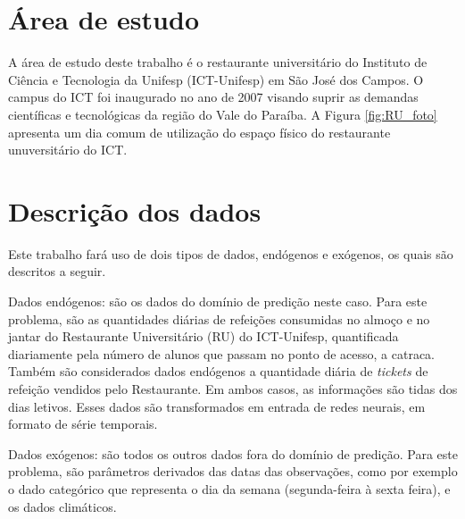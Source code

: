     \section{Área de estudo}
       A área de estudo deste trabalho é o restaurante universitário do Instituto de Ciência e Tecnologia da Unifesp (ICT-Unifesp) em São José dos Campos. O campus do ICT foi inaugurado no ano de 2007 visando suprir as demandas científicas e tecnológicas da região do Vale do Paraíba. A Figura \ref{fig:RU_foto} apresenta um dia comum de utilização do espaço físico do restaurante unuversitário do ICT.
        
        \begin{figure}[H]
        \end{figure}
    
    \section{Descrição dos dados}

    Este trabalho fará uso de dois tipos de dados, endógenos e exógenos, os quais são descritos a seguir. 
            
    Dados endógenos:  são os dados do domínio de predição neste caso. Para este problema, são as quantidades diárias de  refeições consumidas no almoço e no jantar do Restaurante Universitário (RU) do ICT-Unifesp, quantificada diariamente pela número de alunos que passam no ponto de acesso, a catraca. 
    Também são considerados dados endógenos a quantidade diária  de \textit{tickets} de refeição vendidos pelo Restaurante. Em ambos casos, as informações são tidas dos dias letivos.   Esses dados são transformados em entrada de redes neurais, em formato de série temporais.
            
    Dados exógenos: são todos os outros dados fora do domínio de predição. Para este problema, são  parâmetros derivados das datas das observações, como por exemplo o dado categórico que representa o dia da semana (segunda-feira à sexta feira), e os dados climáticos.
    
